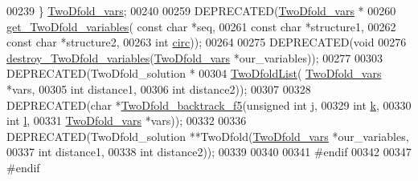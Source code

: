 \begin{DoxyCode}
00239 \} \hyperlink{group__kl__neighborhood__mfe_gaf4f514010a14f9d59d850742b3e96954}{TwoDfold\_vars};
00240 
00259 DEPRECATED(\hyperlink{group__kl__neighborhood__mfe_structTwoDfold__vars}{TwoDfold\_vars} *
00260 \hyperlink{group__kl__neighborhood__mfe_gac9284f132cf0eaa0a2f43590eda05488}{get\_TwoDfold\_variables}( \textcolor{keyword}{const} \textcolor{keywordtype}{char} *seq,
00261                         \textcolor{keyword}{const} \textcolor{keywordtype}{char} *structure1,
00262                         \textcolor{keyword}{const} \textcolor{keywordtype}{char} *structure2,
00263                         \textcolor{keywordtype}{int} \hyperlink{group__model__details_gaf9202a1a09f5828dc731e2d9a10fa111}{circ}));
00264 
00275 DEPRECATED(\textcolor{keywordtype}{void} 
00276 \hyperlink{group__kl__neighborhood__mfe_ga05bf4f31d216b1b160fd2d3d68e9b487}{destroy\_TwoDfold\_variables}(\hyperlink{group__kl__neighborhood__mfe_structTwoDfold__vars}{TwoDfold\_vars} *our\_variables));
00277 
00303 DEPRECATED(TwoDfold\_solution *
00304 \hyperlink{group__kl__neighborhood__mfe_ga7fc5e3e92fe97914ca4eccd33c01c2a7}{TwoDfoldList}( \hyperlink{group__kl__neighborhood__mfe_structTwoDfold__vars}{TwoDfold\_vars} *vars,
00305               \textcolor{keywordtype}{int} distance1,
00306               \textcolor{keywordtype}{int} distance2));
00307 
00328 DEPRECATED(\textcolor{keywordtype}{char} *\hyperlink{group__kl__neighborhood__mfe_gaf4dc05bf8fc1ea53acd7aeb798ba80c2}{TwoDfold\_backtrack\_f5}(\textcolor{keywordtype}{unsigned} \textcolor{keywordtype}{int} j,
00329                             \textcolor{keywordtype}{int} \hyperlink{group__kl__neighborhood__mfe_ac111e850bb3b3a11b6b5707912cfa1b8}{k},
00330                             \textcolor{keywordtype}{int} \hyperlink{group__kl__neighborhood__mfe_ab8e95cd920901175a2cc8de726ab1d36}{l},
00331                             \hyperlink{group__kl__neighborhood__mfe_structTwoDfold__vars}{TwoDfold\_vars} *vars));
00332 
00336 DEPRECATED(TwoDfold\_solution **TwoDfold(\hyperlink{group__kl__neighborhood__mfe_structTwoDfold__vars}{TwoDfold\_vars} *our\_variables,
00337                                         \textcolor{keywordtype}{int} distance1,
00338                                         \textcolor{keywordtype}{int} distance2));
00339 
00340 
00341 \textcolor{preprocessor}{#endif}
00342 
00347 \textcolor{preprocessor}{#endif}
\end{DoxyCode}
